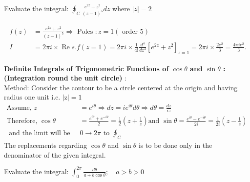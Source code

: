 \begin{exercise}
	Evaluate the integral: $\oint_{C} \frac{e^{2 z}+z^{2}}{(z-1)^{5}} d z$ where $|z|=2$
\end{exercise}
\begin{answer}
	\begin{align*}
	\begin{aligned}
	f(z)&=\frac{e^{2 z}+z^{2}}{(z-1)^{5}} \Rightarrow \text { Poles }: z=1(\text { order } 5) \\
	I&=2 \pi i \times \operatorname{Re} s . f(z=1)=2 \pi i \times \frac{1}{4 !} \frac{d^{4}}{d z^{4}}\left[e^{2 z}+z^{2}\right]_{z=1}=2 \pi i \times \frac{2 e^{2}}{3}=\frac{4 \pi i e^{2}}{3} .
	\end{aligned}
	\end{align*}
\end{answer}
\textbf{Definite Integrals of Trigonometric Functions of $\cos\theta$ and $\sin\theta$ : (Integration round the unit circle)} :\\
	Method: Consider the contour to be a circle centered at the origin and having radius one unit i.e. $|\mathrm{z}|=1$
\begin{align*}
	\text{Assume, }z&=e^{i \theta} \Rightarrow d z=i e^{i \theta} d \theta \Rightarrow d \theta=\frac{d z}{i z}\\
	\text{Therefore, }\cos \theta&=\frac{e^{i \theta}+e^{-i \theta}}{2}=\frac{1}{2}\left(z+\frac{1}{z}\right)
	 \text{and }\sin \theta=\frac{e^{i \theta}-e^{-i \theta}}{2 i}=\frac{1}{2 i}\left(z-\frac{1}{z}\right)\\
	 \text { and the limit will be changed from }& 0 \rightarrow 2 \pi \text { to } \oint_{C}
\end{align*}
The replacements regarding $\cos \theta$ and $\sin \theta$ is to be done only in the denominator of the given integral.
\begin{exercise}
	Evaluate the integral: $\int_{0}^{2 \pi} \frac{d \theta}{a+b \cos \theta} ; \quad a>b>0$
\end{exercise}
